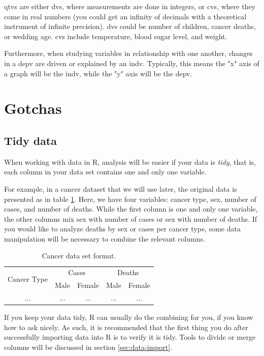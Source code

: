 \documentclass{report}
\begin{document}
	\Glspl{qtv} are either \glspl{dv}, where measurements are done in integers, or \glspl{cv}, where they come in real numbers (you could get an infinity of decimals with a theoretical instrument of infinite precision). \Glspl{dv} could be number of children, cancer deaths, or wedding age. \Glspl{cv} include temperature, blood sugar level, and weight.
	
	Furthermore, when studying variables in relationship with one another, changes in a \gls{depv} are driven or explained by an \gls{indv}. Typically, this means the "x" axis of a graph will be the \gls{indv}, while the "y" axis will be the \gls{depv}.
	
	\section{Gotchas}
		\subsection{Tidy data}
		When working with data in R, analysis will be easier if your data is \emph{tidy}, that is, each column in your data set contains one and only one variable.
	
		For example, in a cancer dataset that we will use later, the original data is presented as in table \ref{table:cancer}. Here, we have four variables: cancer type, sex, number of cases, and number of deaths. While the first column is one and only one variable, the other columns mix sex with number of cases or sex with number of deaths. If you would like to analyze deaths by sex or cases per cancer type, some data manipulation will be necessary to combine the relevant columns.
		\begin{table}[h]
			\centering
			\begin{tabular}{|c|c|c|c|c|}
				\hline 
				\multirow{2}{*}{Cancer Type} & \multicolumn{2}{c|}{Cases}  & \multicolumn{2}{c|}{Deaths} \\ 
				& Male & Female & Male & Female \\  \hline 
				... &  ... & ...  & ...  & ...  \\ \hline 
			\end{tabular} 
			\caption{Cancer data set format.}
			\label{table:cancer}
		\end{table}

		If you keep your data tidy, R can usually do the combining for you, if you know how to ask nicely. As such, it is recommended that the first thing you do after successfully importing data into R is to verify it is tidy. Tools to divide or merge columns will be discussed in section \ref{sec:data-import}.
	
\end{document}
